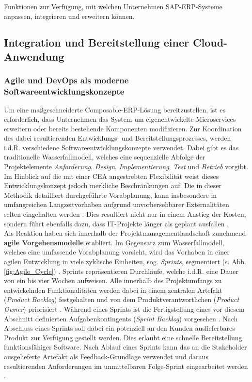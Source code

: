 Funktionen zur Verfügung, mit welchen Unternehmen SAP-ERP-Systeme anpassen, integrieren und erweitern können. 

\subsection{Integration und Bereitstellung einer Cloud-Anwendung}
\subsubsection{Agile und DevOps als moderne Softwareentwicklungskonzepte}
Um eine maßgeschneiderte Composable-ERP-Lösung bereitzustellen, ist es erforderlich, dass Unternehmen das System um eigenentwickelte Microservices erweitern oder bereits bestehende Komponenten modifizieren. Zur Koordination des dabei resultierenden Entwicklungs- und Bereitstellungsprozesses, werden i.d.R. verschiedene Softwareentwicklungskonzepte verwendet. Dabei gibt es das traditionelle Wasserfallmodell, welches eine sequenzielle Abfolge der Projektelemente \textit{Anforderung}, \textit{Design}, \textit{Implementierung}, \textit{Test} und \textit{Betrieb} vorgibt. Im Hinblick auf die mit einer CEA angestrebten Flexibilität weist dieses Entwicklungskonzept jedoch merkliche Beschränkungen auf. Die in dieser Methodik detailliert durchgeführte Vorabplanung, kann insbesondere in umfangreichen Langzeitvorhaben aufgrund unvorhersehbarer Externalitäten selten eingehalten werden \cite[5]{Vivenzio.2013}. Dies resultiert nicht nur in einem Anstieg der Kosten, sondern führt ebenfalls dazu, dass IT-Projekte länger als geplant ausfallen \cite[41]{Vieweg.2015}.\\ Als Reaktion haben sich innerhalb der Projektmanagementlandschaft zunehmend \textbf{agile Vorgehensmodelle} etabliert.
Im Gegensatz zum Wasserfallmodell, welches eine umfassende Vorabplanung vorsieht, wird das Vorhaben in einer agilen Entwicklung in viele zyklische Einheiten, sog. \textit{Sprints}, segmentiert (s. Abb. \ref{fig:Agile_Cycle}) \cite[87]{Goll.2015}. Sprints repräsentieren Durchläufe, welche i.d.R. eine Dauer von ein bis vier Wochen aufweisen. Alle innerhalb des Projektumfangs zu entwickelnden Funktionalitäten werden dabei in einem zentralen Artefakt (\textit{Product Backlog}) festgehalten und von dem Produktverantwortlichen (\textit{Product Owner}) priorisiert \cite[196]{Gloger.2010}. Während eines Sprints ist die Fertigstellung eines vor diesem Abschnitt definierten Aufgabenkontingents (\textit{Sprint Backlog}) vorgesehen \cite[194]{.2013}. Nach Abschluss eines Sprints soll dabei ein potenziell an den Kunden auslieferbares Produkt zur Verfügung gestellt werden. Dies erlaubt eine schnelle Bereitstellung funktionsfähiger Software. Nach Ablauf eines Sprints kann das an die Stakeholder ausgelieferte Artefakt als Feedback-Grundlage verwendet und daraus resultierenden Anforderungen im unmittelbaren Folge-Sprint eingearbeitet werden \cite[S. 180 ff.]{Gloger.2016b}.
